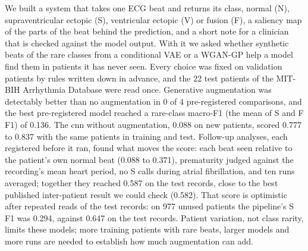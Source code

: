 We built a system that takes one ECG beat and returns its class, normal (N), supraventricular ectopic (S), ventricular ectopic (V) or fusion (F), a saliency map of the parts of the beat behind the prediction, and a short note for a clinician that is checked against the model output. With it we asked whether synthetic beats of the rare classes from a conditional VAE or a WGAN-GP help a model find them in patients it has never seen. Every choice was fixed on validation patients by rules written down in advance, and the 22 test patients of the MIT-BIH Arrhythmia Database were read once. Generative augmentation was detectably better than no augmentation in 0 of 4 pre-registered comparisons, and the best pre-registered model reached a rare-class macro-F1 (the mean of S and F F1) of 0.136. The cnn without augmentation, 0.088 on new patients, scored 0.777 to 0.837 with the same patients in training and test. Follow-up analyses, each registered before it ran, found what moves the score: each beat seen relative to the patient's own normal beat (0.088 to 0.371), prematurity judged against the recording's mean heart period, no S calls during atrial fibrillation, and ten runs averaged; together they reached 0.587 on the test records, close to the best published inter-patient result we could check (0.582). That score is optimistic after repeated reads of the test records: on 977 unused patients the pipeline's S F1 was 0.294, against 0.647 on the test records. Patient variation, not class rarity, limits these models; more training patients with rare beats, larger models and more runs are needed to establish how much augmentation can add.
